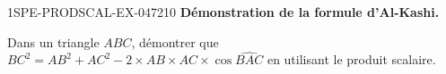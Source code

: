 \begin{exercice}{1SPE-PRODSCAL-EX-047}{2}{10}
\textbf{Démonstration de la formule d'Al-Kashi.}

Dans un triangle $ABC$, démontrer que $BC^2 = AB^2 + AC^2 - 2 \times AB \times AC \times \cos\widehat{BAC}$ en utilisant le produit scalaire.
\end{exercice}
